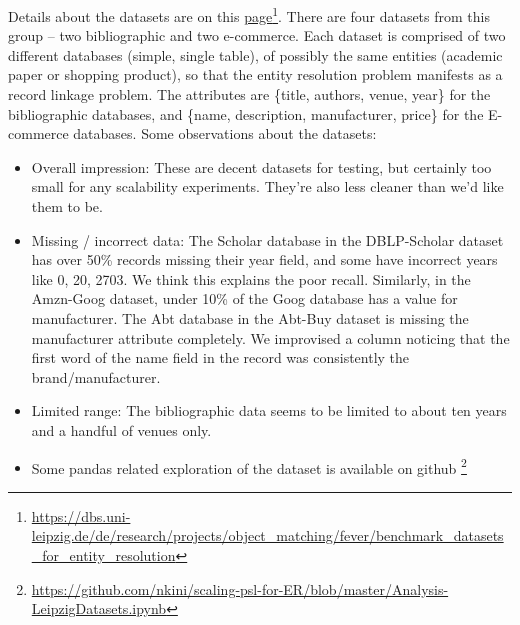 \documentclass{article}
\begin{document}
Details about the datasets are on this \href{https://dbs.uni-leipzig.de/de/research/projects/object_matching/fever/benchmark_datasets_for_entity_resolution}{page}\footnote{\url{https://dbs.uni-leipzig.de/de/research/projects/object_matching/fever/benchmark_datasets_for_entity_resolution}}. There are four datasets from this group -- two bibliographic and two e-commerce. Each dataset is comprised of two different databases (simple, single table), of possibly the same entities (academic paper or shopping product), so that the entity resolution problem manifests as a record linkage problem. The attributes are \{title, authors, venue, year\} for the bibliographic databases, and \{name, description, manufacturer, price\} for the E-commerce databases. Some observations about the datasets:
\begin{itemize}
    \item Overall impression: These are decent datasets for testing, but certainly too small for any scalability experiments. They're also less cleaner than we'd like them to be.
    \item Missing / incorrect data: The Scholar database in the DBLP-Scholar dataset has over 50\% records missing their year field, and some have incorrect years like 0, 20, 2703. We think this explains the poor recall. Similarly, in the Amzn-Goog dataset, under 10\% of the Goog database has a value for manufacturer. The Abt database in the Abt-Buy dataset is missing the manufacturer attribute completely. We improvised a column noticing that the first word of the name field in the record was consistently the brand/manufacturer.
    \item Limited range: The bibliographic data seems to be limited to about ten years and a handful of venues only.
    \item Some pandas related exploration of the dataset is available on github \footnote{\url{https://github.com/nkini/scaling-psl-for-ER/blob/master/Analysis-LeipzigDatasets.ipynb}}
\end{itemize}
\end{document}
